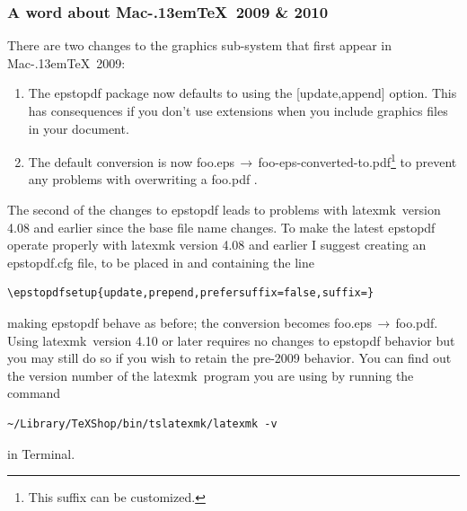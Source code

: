 \documentclass[11pt]{article}
\newcommand{\cmd}[1]{\textsf{#1}}
\newcommand{\To}{\,\(\to\)\,}
\newcommand{\MacTeX}{Mac\kern-.13em\TeX}
\newcommand{\latexmk}{\textsf{latexmk}}
\begin{document}

\subsubsection{A word about \MacTeX\ 2009 \& 2010}

There are two changes to the graphics sub-system that first appear in \MacTeX\ 2009:
\begin{enumerate}
\item
The \cmd{epstopdf} package now defaults to using the \cmd{[update,append]} option. This has consequences if you don't use extensions when you include graphics files in your document.
\item
The default conversion is now \cmd{foo.eps}\To\cmd{foo-eps-converted-to.pdf}\footnote{This suffix can be customized.} to prevent any problems with overwriting a \cmd{foo.pdf} .
\end{enumerate}
The second of the changes to \cmd{epstopdf} leads to problems with \latexmk\ version 4.08 and earlier since the base file name changes. To make the latest \cmd{epstopdf} operate properly with latexmk version 4.08 and earlier I suggest creating an \cmd{epstopdf.cfg} file, to be placed in  and containing the line
\begin{verbatim}
\epstopdfsetup{update,prepend,prefersuffix=false,suffix=}
\end{verbatim}
making \cmd{epstopdf} behave as before; the conversion becomes \cmd{foo.eps}\To\cmd{foo.pdf}. Using \latexmk\ version 4.10 or later requires no changes to \cmd{epstopdf} behavior but you may still do so if you wish to retain the pre-2009 behavior. You can find out the version number of the \latexmk\ program you are using by running the command
\begin{verbatim}
~/Library/TeXShop/bin/tslatexmk/latexmk -v
\end{verbatim}
in \cmd{Terminal}.
\end{document}
